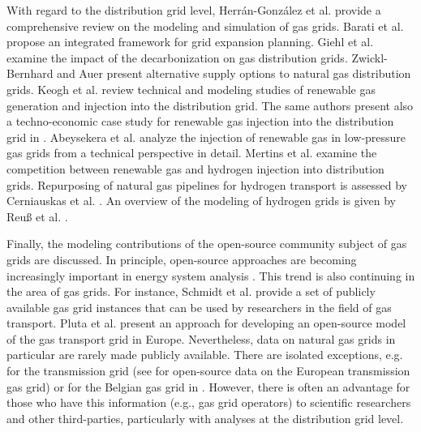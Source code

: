 With regard to the distribution grid level, Herr{\'a}n-Gonz{\'a}lez et al. \cite{herran2009modeling} provide a comprehensive review on the modeling and simulation of gas grids. Barati et al. \cite{barati2014multi} propose an integrated framework for grid expansion planning.  Giehl et al. \cite{giehl2023assessment} examine the impact of the decarbonization on gas distribution grids. Zwickl-Bernhard and Auer \cite{zwickl2022demystifying} present alternative supply options to natural gas distribution grids. Keogh et al. \cite{keogh2022gas} review technical and modeling studies of renewable gas generation and injection into the distribution grid. The same authors present also a techno-economic case study for renewable gas injection into the distribution grid in \cite{keogh2022gas}. Abeysekera et al. \cite{abeysekera2016steady} analyze the injection of renewable gas in low-pressure gas grids from a technical perspective in detail. Mertins et al. \cite{mertins2023competition} examine the competition between renewable gas and hydrogen injection into distribution grids. Repurposing of natural gas pipelines for hydrogen transport is assessed by Cerniauskas et al. \cite{cerniauskas2020options}. An overview of the modeling of hydrogen grids is given by Reuß et al. \cite{reuss2019modeling}.\vspace{0.3cm}

Finally, the modeling contributions of the open-source community subject of gas grids are discussed. In principle, open-source approaches are becoming increasingly important in energy system analysis \cite{hulk2018transparency}. This trend is also continuing in the area of gas grids. For instance, Schmidt et al. \cite{schmidt2017gaslib} provide a set of publicly available gas grid instances that can be used by researchers in the field of gas transport. Pluta et al. \cite{pluta2022scigrid_gas} present an approach for developing an open-source model of the gas transport grid in Europe. Nevertheless, data on natural gas grids in particular are rarely made publicly available. There are isolated exceptions, e.g. for the transmission grid (see \cite{entsog} for open-source data on the European transmission gas grid) or for the Belgian gas grid in \cite{de2000gas}. However, there is often an advantage for those who have this information (e.g., gas grid operators) to scientific researchers and other third-parties, particularly with analyses at the distribution grid level. 

